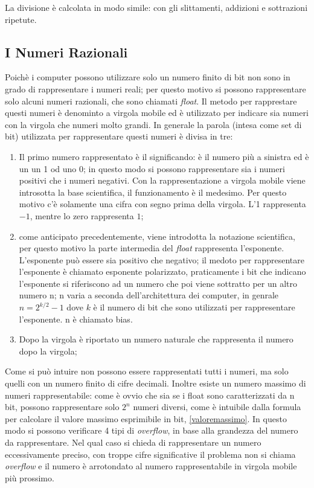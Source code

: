 \documentclass{article}
\begin{document}
La divisione è calcolata in modo simile: con gli slittamenti, addizioni e sottrazioni ripetute.

\subsection{I Numeri Razionali}

Poichè i computer possono utilizzare solo un numero finito di bit non sono in grado di rappresentare i numeri reali; per questo motivo si possono rappresentare solo alcuni numeri razionali, che sono chiamati \textit{float}. Il metodo per rapprestare questi numeri è denominto a virgola mobile ed è utilizzato per indicare sia numeri con la virgola che numeri molto grandi. In generale la parola (intesa come set di bit) utilizzata per rappresentare questi numeri è divisa in tre:
\begin{enumerate}
	\item Il primo numero rappresentato è il significando: è il numero più a sinistra ed è un un 1 od uno 0; in questo modo si possono rappresentare sia i numeri positivi che i numeri negativi. Con la rappresentazione a virgola mobile viene introsotta la base scientifica, il funzionamento è il medesimo. Per questo motivo c'è solamente una cifra con segno prima della virgola. L'1 rappresenta $-1$, mentre lo zero rappresenta $1$;

	\item \label{bias} come anticipato precedentemente, viene introdotta la notazione scientifica, per questo motivo la parte intermedia del \textit{float} rappresenta l'esponente. L'esponente può essere sia positivo che negativo; il medoto per rappresentare l'esponente è chiamato esponente polarizzato, praticamente i bit che indicano l'esponente si riferiscono ad un numero che poi viene sottratto per un altro numero n; n varia a seconda dell'architettura dei computer, in genrale $n=2^{k/2}-1$ dove $k$ è il numero di bit che sono utilizzati per rappresentare l'esponente. n è chiamato bias.

	\item \label{mantisse}Dopo la virgola è riportato un numero naturale che rappresenta il numero dopo la virgola;
\end{enumerate}

Come si può intuire non possono essere rappresentati tutti i numeri, ma solo quelli con un numero finito di cifre decimali. Inoltre esiste un numero massimo di numeri rappresentabile: come è ovvio che sia se i float sono caratterizzati da n bit, possono rappresentare solo $2^n$ numeri diversi, come è intuibile dalla formula per calcolare il valore massimo esprimibile in bit, \autoref{valoremassimo}.
In questo modo si possono verificare 4 tipi di \textit{overflow}, in base alla grandezza del numero da rappresentare. Nel qual caso si chieda di rappresentare un numero eccessivamente preciso, con troppe cifre significative il problema non si chiama \textit{overflow} e il numero è arrotondato al numero rappresentabile in virgola mobile più prossimo.
\end{document}
